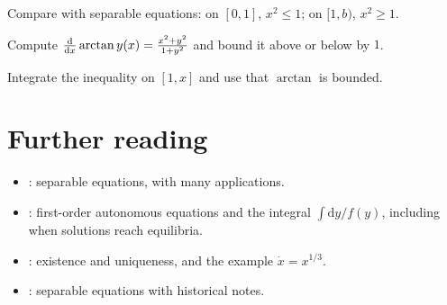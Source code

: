 \begin{hintlevels}
  \item Compare with separable equations: on $[0,1]$, $x^2\le 1$; on
        $[1,b)$, $x^2\ge 1$.
  \item Compute $\frac{\mathrm{d}}{\mathrm{d}x}\arctan y(x) = \frac{x^2 + y^2}{1 + y^2}$ and bound it
        above or below by $1$.
  \item Integrate the inequality on $[1,x]$ and use that $\arctan$ is bounded.
\end{hintlevels}

\section{Further reading}\label{sec:ch03-reading}

\begin{itemize}
  \item \textcite[\S2.2]{BoyceDiPrima}: separable equations, with many
        applications.
  \item \textcite[\S1.3]{Teschl}: first-order autonomous equations and the
        integral $\int\mathrm{d}y/f(y)$, including when solutions reach
        equilibria.
  \item \textcite[\S2.5]{Strogatz}: existence and uniqueness, and the example
        $\dot x = x^{1/3}$.
  \item \textcite[Ch.~1]{Simmons}: separable equations with historical notes.
\end{itemize}
